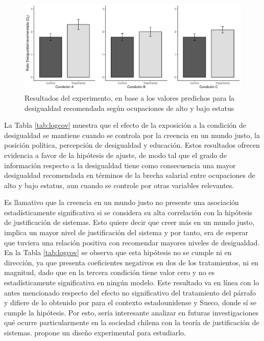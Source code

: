 \documentclass[12pt]{article}
\begin{document}
\begin{figure}[H]
	\centering 
	\includegraphics[width=0.85\linewidth]{Resultados/images/barplot2} 
	\caption{Resultados del experimento, en base a los valores predichos para la desigualdad recomendada según ocupaciones de alto y bajo estatus}
	\label{fig:barplot2}
\end{figure}


\renewcommand{\arraystretch}{1}
\renewcommand{\baselinestretch}{1}



La Tabla \ref{tab:logcov} muestra que el efecto de la exposición a la condición de desigualdad se mantiene cuando se controla por la creencia en un mundo justo, la posición política, percepción de desigualdad y educación. Estos resultados ofrecen evidencia a favor de la hipótesis de ajuste, de modo tal que el grado de información respecto a la desigualdad tiene como consecuencia una mayor desigualdad recomendada en términos de la brecha salarial entre ocupaciones de alto y bajo estatus, aun cuando se controle por otras variables relevantes. 

Es llamativo que la creencia en un mundo justo no presente una asociación estadísticamente significativa si se considera su alta correlación con la hipótesis de justificación de sistemas. Esto quiere decir que creer más en un mundo justo, implica un mayor nivel de justificación del sistema y por tanto, era de esperar que tuviera una relación positiva con recomendar mayores niveles de desigualdad. En la Tabla \ref{tab:logcov} se observa que esta hipótesis no se cumple ni en dirección, ya que presenta coeficientes negativos en dos de los tratamientos, ni en magnitud, dado que en la tercera condición tiene valor cero y no es estadísticamente significativa en ningún modelo. Este resultado va en línea con lo antes mencionado respecto del efecto no significativo del tratamiento del párrafo y difiere de lo obtenido por \cite{Trump2017} para el contexto estadounidense y Sueco, donde sí se cumple la hipótesis. Por esto, sería interesante analizar en futuras investigaciones qué ocurre particularmente en la sociedad chilena con la teoría de justificación de sistemas. \cite{Trump2017} propone un diseño experimental para estudiarlo. 
  
\end{document}
